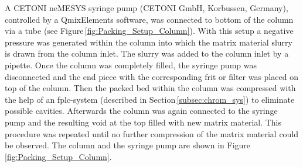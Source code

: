 A CETONI neMESYS syringe pump (CETONI GmbH, Korbussen, Germany), controlled by a QmixElements software, was connected to bottom of the column via a tube (see Figure\,\ref{fig:Packing_Setup_Column}). With this setup a negative pressure was generated within the column into which the matrix material slurry is drawn from the column inlet. The slurry was added to the column inlet by a pipette. Once the column was completely filled, the syringe pump was disconnected and the end piece with the corresponding frit or filter was placed on top of the column. Then the packed bed within the column was compressed with the help of an \gls{fplc}-system (described in Section\,\ref{subsec:chrom_sys}) to eliminate possible cavities. Afterwards the column was again connected to the syringe pump and the resulting void at the top filled with new matrix material. This procedure was repeated until no further compression of the matrix material could be observed. The column and the syringe pump are shown in Figure\,\ref{fig:Packing_Setup_Column}.


